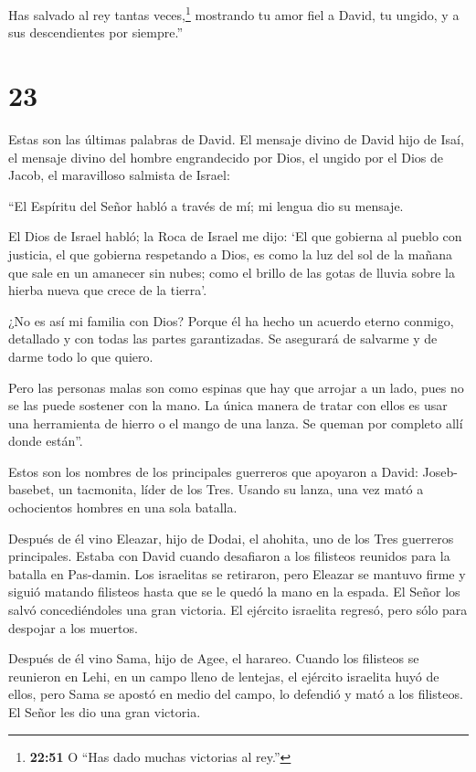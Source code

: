  Has salvado al rey tantas veces,\footnote{\textbf{22:51} O
  ``Has dado muchas victorias al rey.''} mostrando tu amor fiel a David,
tu ungido, y a sus descendientes por siempre.''

\hypertarget{section-22}{%
\section{23}\label{section-22}}

 Estas son las últimas palabras de David. El mensaje divino
de David hijo de Isaí, el mensaje divino del hombre engrandecido por
Dios, el ungido por el Dios de Jacob, el maravilloso salmista de Israel:

 ``El Espíritu del Señor habló a través de mí; mi lengua dio
su mensaje.

 El Dios de Israel habló; la Roca de Israel me dijo: `El que
gobierna al pueblo con justicia, el que gobierna respetando a Dios,
 es como la luz del sol de la mañana que sale en un amanecer
sin nubes; como el brillo de las gotas de lluvia sobre la hierba nueva
que crece de la tierra'.

 ¿No es así mi familia con Dios? Porque él ha hecho un
acuerdo eterno conmigo, detallado y con todas las partes garantizadas.
Se asegurará de salvarme y de darme todo lo que quiero.

 Pero las personas malas son como espinas que hay que
arrojar a un lado, pues no se las puede sostener con la mano.
 La única manera de tratar con ellos es usar una herramienta
de hierro o el mango de una lanza. Se queman por completo allí donde
están''.

 Estos son los nombres de los principales guerreros que
apoyaron a David: Joseb-basebet, un tacmonita, líder de los Tres. Usando
su lanza, una vez mató a ochocientos hombres en una sola batalla.

 Después de él vino Eleazar, hijo de Dodai, el ahohita, uno
de los Tres guerreros principales. Estaba con David cuando desafiaron a
los filisteos reunidos para la batalla en Pas-damin. Los israelitas se
retiraron,  pero Eleazar se mantuvo firme y siguió matando
filisteos hasta que se le quedó la mano en la espada. El Señor los salvó
concediéndoles una gran victoria. El ejército israelita regresó, pero
sólo para despojar a los muertos.

 Después de él vino Sama, hijo de Agee, el harareo. Cuando
los filisteos se reunieron en Lehi, en un campo lleno de lentejas, el
ejército israelita huyó de ellos,  pero Sama se apostó en
medio del campo, lo defendió y mató a los filisteos. El Señor les dio
una gran victoria.

